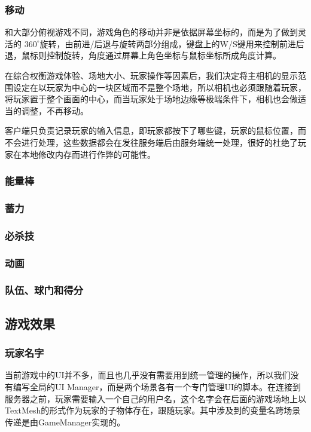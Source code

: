 \documentclass[conference]{IEEEtran}
\begin{document}
\subsubsection{移动}
和大部分俯视游戏不同，游戏角色的移动并非是依据屏幕坐标的，而是为了做到灵活的 $360^\circ$旋转，由前进/后退与旋转两部分组成，键盘上的W/S键用来控制前进后退，鼠标则控制旋转，角度通过屏幕上角色坐标与鼠标坐标所成角度计算。

在综合权衡游戏体验、场地大小、玩家操作等因素后，我们决定将主相机的显示范围设定在以玩家为中心的一块区域而不是整个场地，所以相机也必须跟随着玩家，将玩家置于整个画面的中心，而当玩家处于场地边缘等极端条件下，相机也会做适当的调整，不再移动。

客户端只负责记录玩家的输入信息，即玩家都按下了哪些键，玩家的鼠标位置，而不会进行处理，这些数据都会在发往服务端后由服务端统一处理，很好的杜绝了玩家在本地修改内存而进行作弊的可能性。


\subsubsection{能量棒}
\subsubsection{蓄力}
\subsubsection{必杀技}
\subsubsection{动画}
\subsubsection{队伍、球门和得分}


\subsection{游戏效果}
\subsubsection{玩家名字}
当前游戏中的UI并不多，而且也几乎没有需要用到统一管理的操作，所以我们没有编写全局的UI Manager，而是两个场景各有一个专门管理UI的脚本。在连接到服务器之前，玩家需要输入一个自己的用户名，这个名字会在后面的游戏场地上以TextMesh的形式作为玩家的子物体存在，跟随玩家。其中涉及到的变量名跨场景传递是由GameManager实现的。
\end{document}
